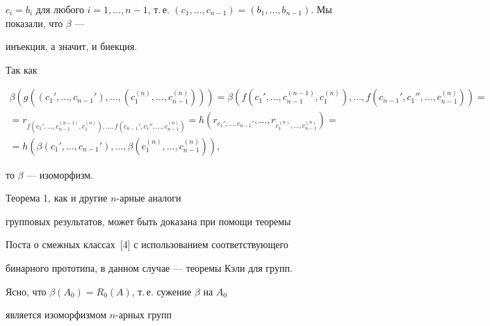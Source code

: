 \begin{pf}
$c_i = b_i$ для любого $i = 1,\dotsc, n-1$, т.\,е. $(c_1,\dotsc,


c_{n-1}) = (b_1,\dotsc, b_{n-1})$. Мы показали, что $\beta$ ---


инъекция, а значит, и биекция.





Так как


\begin{multline*}


\beta(g((c_1',\dotsc,c_{n-1}'),\dotsc,(c_1^{(n)},\dotsc,c_{n-1}^{(n)})))=


\beta(f(c_1',\dotsc,c_{n-1}^{(n-1)},c_1^{(n)}),\dotsc,


f(c_{n-1}',c_1'',\dotsc,c_{n-1}^{(n)}))= \\


%


=r_{f(c_1',\dotsc,c_{n-1}^{(n-1)},c_1^{(n)}),\dotsc,


f(c_{n-1}',c_1'',\dotsc,c_{n-1}^{(n)})}=


h(r_{c_1',\dotsc,c_{n-1}'},\dotsc,


r_{c_1^{(n)},\dotsc,c_{n-1}^{(n)}})= \\


%


=h(\beta(c_1',\dotsc,c_{n-1}'),\dotsc,


\beta(c_1^{(n)},\dotsc,c_{n-1}^{(n)})),


\end{multline*}


то $\beta$ --- изоморфизм.


\end{pf}





\begin{notenonum} Теорема 1, как и другие $n$-арные аналоги


групповых результатов, может быть доказана при помощи теоремы


Поста о смежных классах~[4] с использованием соответствующего


бинарного прототипа, в данном случае --- теоремы Кэли для групп.


\end{notenonum}





Ясно, что $\beta(A_0) = R_0(A)$, т.\,е. сужение $\beta$ на $A_0$


является изоморфизмом $n$-арных групп


